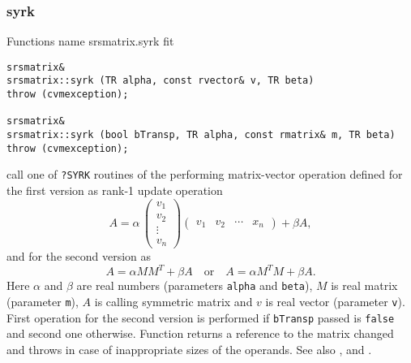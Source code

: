 \subsubsection{syrk}
Functions%
\pdfdest name {srsmatrix.syrk} fit
\begin{verbatim}
srsmatrix& 
srsmatrix::syrk (TR alpha, const rvector& v, TR beta) 
throw (cvmexception);

srsmatrix& 
srsmatrix::syrk (bool bTransp, TR alpha, const rmatrix& m, TR beta)
throw (cvmexception);
\end{verbatim}
call one of \verb"?SYRK" routines of the
performing  matrix-vector operation defined for the first version as
rank-1 update operation
\begin{equation*}
A=\alpha\,\begin{pmatrix}
v_1 \\
v_2 \\
\vdots \\
v_n
\end{pmatrix}
\begin{pmatrix}
v_1 & v_2 & \cdots & x_n
\end{pmatrix} + \beta A,
\end{equation*}
and for the second version as
\begin{equation*}
A=\alpha MM^T + \beta A\quad\text{or}\quad A=\alpha M^TM + \beta A.
\end{equation*}
Here $\alpha$ and $\beta$ are real numbers 
(parameters \verb"alpha" and \verb"beta"),
$M$ is real matrix (parameter \verb"m"),
$A$ is  calling symmetric matrix
and $v$ is real vector (parameter \verb"v").
First operation for the second version 
is performed if \verb"bTransp" passed
is \verb"false" and second one otherwise.
Function
returns a reference to the matrix changed and throws
in case of inappropriate sizes of the operands.
See also
,
 and .

